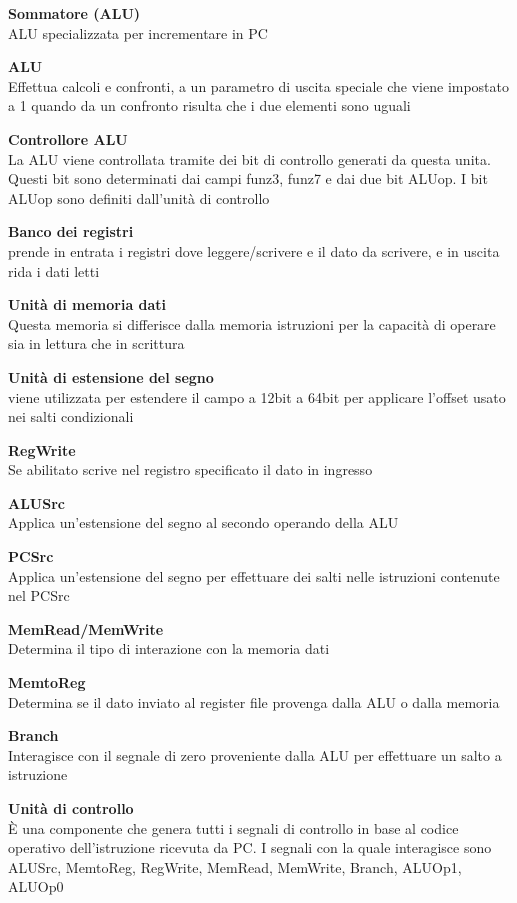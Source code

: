 \documentclass[12pt, a4paper]{article}
\begin{document}
\textbf{Sommatore (ALU)}\\ALU specializzata per incrementare in PC

\textbf{ALU}\\Effettua calcoli e confronti, a un parametro di uscita speciale che viene impostato a 1 quando da un confronto
risulta che i due elementi sono uguali

\textbf{Controllore ALU}\\La ALU viene controllata tramite dei bit di controllo generati da questa unita. Questi bit
sono determinati dai campi funz3, funz7 e dai due bit ALUop. I bit ALUop sono definiti dall'unità di controllo

\textbf{Banco dei registri}\\prende in entrata i registri dove leggere/scrivere e il dato da scrivere, e in uscita rida i 
dati letti

\textbf{Unità di memoria dati}\\Questa memoria si differisce dalla memoria istruzioni per la capacità di operare sia 
in lettura che in scrittura

\textbf{Unità di estensione del segno}\\viene utilizzata per estendere il campo a 12bit a 64bit per applicare l'offset
usato nei salti condizionali

\textbf{RegWrite}\\Se abilitato scrive nel registro specificato il dato in ingresso

\textbf{ALUSrc}\\Applica un'estensione del segno al secondo operando della ALU

\textbf{PCSrc}\\Applica un'estensione del segno per effettuare dei salti nelle istruzioni contenute nel PCSrc

\textbf{MemRead/MemWrite}\\Determina il tipo di interazione con la memoria dati

\textbf{MemtoReg}\\Determina se il dato inviato al register file provenga dalla ALU o dalla memoria

\textbf{Branch}\\Interagisce con il segnale di zero proveniente dalla ALU per effettuare un salto a istruzione

\textbf{Unità di controllo}\\È una componente che genera tutti i segnali di controllo in base al codice operativo
dell'istruzione ricevuta da PC. I segnali con la quale interagisce sono ALUSrc, MemtoReg, RegWrite, MemRead, 
MemWrite, Branch, ALUOp1, ALUOp0
\end{document}
